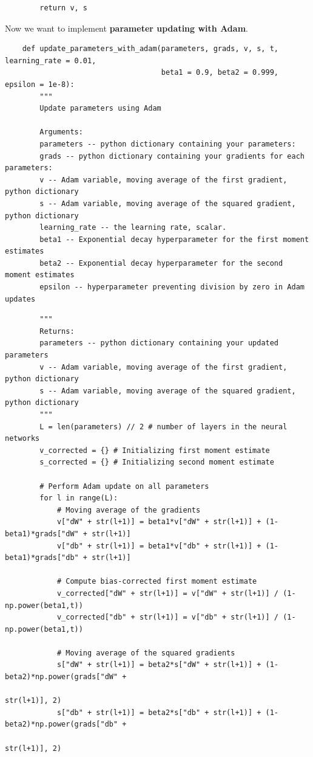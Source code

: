 \documentclass[11pt, a4paper]{article}
\begin{document}
\begin{spacing}{1.1}
\begin{lstlisting}
		return v, s	\end{lstlisting} \vspace*{1mm}
	Now we want to implement \textbf{parameter updating with Adam}. 
	\begin{lstlisting}
	def update_parameters_with_adam(parameters, grads, v, s, t, learning_rate = 0.01,
	                                beta1 = 0.9, beta2 = 0.999,  epsilon = 1e-8):
		"""
		Update parameters using Adam
		
		Arguments:
		parameters -- python dictionary containing your parameters:
		grads -- python dictionary containing your gradients for each parameters:
		v -- Adam variable, moving average of the first gradient, python dictionary
		s -- Adam variable, moving average of the squared gradient, python dictionary 
		learning_rate -- the learning rate, scalar.
		beta1 -- Exponential decay hyperparameter for the first moment estimates 
		beta2 -- Exponential decay hyperparameter for the second moment estimates 
		epsilon -- hyperparameter preventing division by zero in Adam updates \end{lstlisting} \newpage
		
		\begin{lstlisting}
		"""
		Returns:
		parameters -- python dictionary containing your updated parameters 
		v -- Adam variable, moving average of the first gradient, python dictionary
		s -- Adam variable, moving average of the squared gradient, python dictionary
		"""
		L = len(parameters) // 2 # number of layers in the neural networks
		v_corrected = {} # Initializing first moment estimate
		s_corrected = {} # Initializing second moment estimate
		
		# Perform Adam update on all parameters
		for l in range(L):
			# Moving average of the gradients
			v["dW" + str(l+1)] = beta1*v["dW" + str(l+1)] + (1-beta1)*grads["dW" + str(l+1)]
			v["db" + str(l+1)] = beta1*v["db" + str(l+1)] + (1-beta1)*grads["db" + str(l+1)]
			
			# Compute bias-corrected first moment estimate
			v_corrected["dW" + str(l+1)] = v["dW" + str(l+1)] / (1-np.power(beta1,t))
			v_corrected["db" + str(l+1)] = v["db" + str(l+1)] / (1-np.power(beta1,t))
			
			# Moving average of the squared gradients
			s["dW" + str(l+1)] = beta2*s["dW" + str(l+1)] + (1-beta2)*np.power(grads["dW" + 
			                                                                   str(l+1)], 2)
			s["db" + str(l+1)] = beta2*s["db" + str(l+1)] + (1-beta2)*np.power(grads["db" + 
			                                                                   str(l+1)], 2)
			

\end{lstlisting}
\end{spacing}
\end{document}
